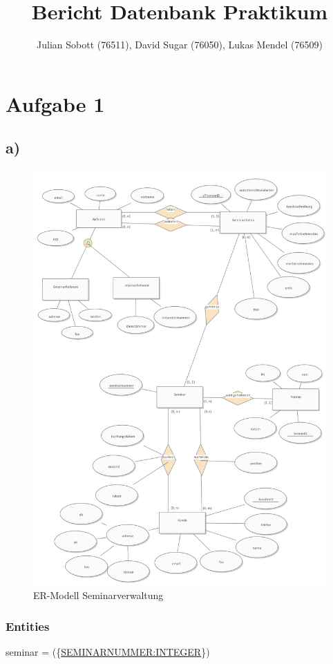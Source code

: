\documentclass[10pt,a4paper]{report}
\author{Julian Sobott (76511), David Sugar (76050), Lukas Mendel (76509)}
\title{Bericht Datenbank Praktikum}
\begin{document}
\maketitle
\tableofcontents

\newpage
\section{Aufgabe 1}
\subsection{a)}


\begin{figure}[ht!]
	\includegraphics[scale=0.2]{Bilder/ER-Modell.PNG}
	\caption{ER-Modell Seminarverwaltung}
	\label{er:1}
\end{figure}
\newpage
\subsubsection{Entities}
seminar = (\{\underline{SEMINARNUMMER:INTEGER}\})
\end{document}
